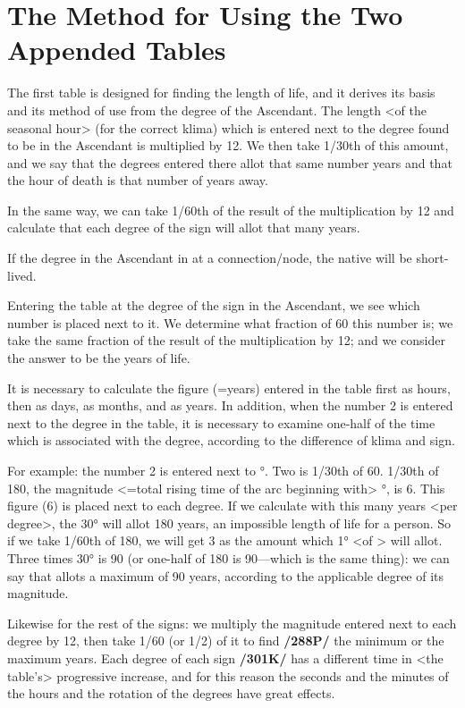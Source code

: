 \section{The Method for Using the Two Appended Tables}

The first table is designed for finding the length of life, and it derives its basis and its method of use from the degree of the Ascendant. The length <of the seasonal hour> (for the correct klima) which is
entered next to the degree found to be in the Ascendant is multiplied by 12. We then take 1/30th of this amount, and we say that the degrees entered there allot that same number years and that the hour of death is that number of years away. 

In the same way, we can take 1/60th of the result of the multiplication by 12 and calculate that each degree of the sign will allot that many years. 

If the degree in the Ascendant in at a connection/node, the native will be short-lived.

Entering the table at the degree of the sign in the Ascendant, we see which number is placed next to it. We determine what fraction of 60 this number is; we take the same fraction of the result of the multiplication by 12; and we consider the answer to be the years of life. 

It is necessary to calculate the figure (=years) entered in the table first as hours, then as days, as months, and as years. In addition, when
the number 2 is entered next to the degree in the table, it is necessary to examine one-half of the time which is associated with the degree, according to the difference of klima and sign.

For example: the number 2 is entered next to \Libra\xspace 1°. Two is 1/30th of 60. 1/30th of 180, the magnitude <=total rising time of the arc beginning with> \Libra\xspace 1°, is 6. This figure (6) is placed next to each degree. If we calculate with this many years <per degree>, the 30° will allot 180 years, an impossible length of life for a person. So if we take 1/60th of 180, we will get 3 as the amount which 1° <of \Libra> will allot. Three times 30° is 90 (or one-half of 180 is 90—which is the same thing): we can say that \Libra\xspace allots a maximum of 90 years, according to the applicable degree of its magnitude.

Likewise for the rest of the signs: we multiply the magnitude entered next to each degree by 12, then take 1/60 (or 1/2) of it to find \textbf{/288P/} the minimum or the maximum years. Each degree of each sign
\textbf{/301K/} has a different time in <the table’s> progressive increase, and for this reason the seconds and the minutes of the hours and the rotation of the degrees have great effects.

